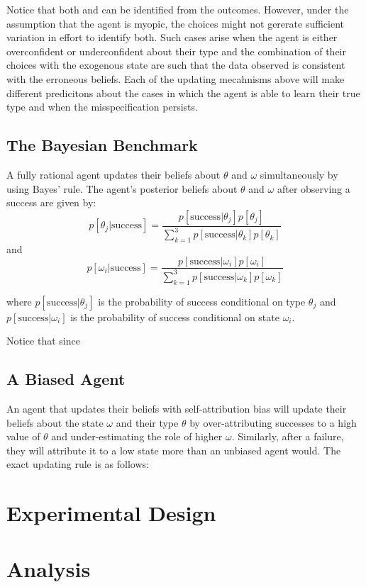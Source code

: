 \documentclass[
  12pt,
]{article}
\begin{document}
Notice that both \theta and \omega can be identified from the outcomes.
However, under the assumption that the agent is myopic, the choices
might not gererate sufficient variation in effort to identify both. Such
cases arise when the agent is either overconfident or underconfident
about their type and the combination of their choices with the exogenous
state are such that the data observed is consistent with the erroneous
beliefs. Each of the updating mecahnisms above will make different
predicitons about the cases in which the agent is able to learn their
true type and when the misspecification persists.

\hypertarget{the-bayesian-benchmark}{%
\subsection{The Bayesian Benchmark}\label{the-bayesian-benchmark}}

A fully rational agent updates their beliefs about \(\theta\) and
\(\omega\) simultaneously by using Bayes' rule. The agent's posterior
beliefs about \(\theta\) and \(\omega\) after observing a success are
given by: \begin{equation}
p[\theta_j|\text{success}] = \frac{p[\text{success}|\theta_j]p[\theta_j]}{\sum_{k=1}^3 p[\text{success}|\theta_k]p[\theta_k]}
\end{equation} and \begin{equation}
p[\omega_i|\text{success}] = \frac{p[\text{success}|\omega_i]p[\omega_i]}{\sum_{k=1}^3 p[\text{success}|\omega_k]p[\omega_k]}
\end{equation}

where \(p[\text{success}|\theta_j]\) is the probability of success
conditional on type \(\theta_j\) and \(p[\text{success}|\omega_i]\) is
the probability of success conditional on state \(\omega_i\).

Notice that since

\hypertarget{a-biased-agent}{%
\subsection{A Biased Agent}\label{a-biased-agent}}

An agent that updates their beliefs with self-attribution bias will
update their beliefs about the state \(\omega\) and their type
\(\theta\) by over-attributing successes to a high value of \(\theta\)
and under-estimating the role of higher \(\omega\). Similarly, after a
failure, they will attribute it to a low state more than an unbiased
agent would. The exact updating rule is as follows: \begin{equation}

\end{equation}

\hypertarget{experimental-design}{%
\section{Experimental Design}\label{experimental-design}}

\hypertarget{analysis}{%
\section{Analysis}\label{analysis}}

\renewcommand\refname{Conclusion}
  
\end{document}
